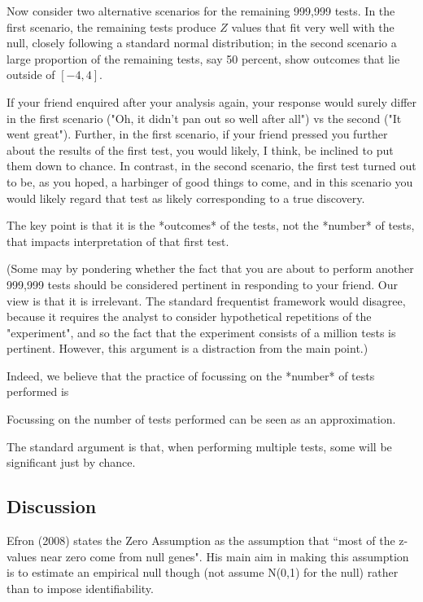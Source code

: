 \documentclass[10pt]{article}
\begin{document}
Now consider two alternative scenarios for the remaining 999,999 tests. In the first scenario, the remaining tests
produce $Z$ values that fit very well with the null, closely following a standard normal distribution; in the second
scenario a large proportion of the remaining tests, say 50 percent, show outcomes that lie outside of $[-4,4]$. 

If your friend enquired after your analysis again, your
response would surely differ in the first scenario ("Oh, it didn't pan out so well after all") vs the second ("It went great"). Further,
in the first scenario, if your friend pressed you further about the results of the first test,
you would likely, I think, be inclined to put them down to chance. In contrast, in the second scenario, the first test turned out to be, as you hoped, a harbinger of good things to come, and in this scenario you would likely regard that test as likely corresponding to a true discovery.

The key point is that it is the *outcomes* of the tests, not the *number* of tests, that impacts interpretation of that first test. 

(Some may by pondering whether the fact that you are about to perform another
999,999 tests should be considered pertinent in responding to your friend. Our view is that it is  irrelevant.
The standard frequentist framework would disagree, because
it requires the analyst to consider hypothetical repetitions
of the "experiment", and so the fact that the experiment
consists of a million tests is pertinent. However, this
argument is a distraction from the main point.)

Indeed, we believe that the practice of focussing on the *number* of tests performed is 

Focussing on the number of tests performed can be
seen as an approximation. 

The standard argument is that,
when performing multiple tests, some will be significant
just by chance.

\subsection{Discussion}

Efron (2008) states the Zero Assumption as the assumption that ``most of the z-values near zero come from null genes".
His main aim in making this assumption is to estimate an empirical null though (not assume N(0,1) for the null)
rather than to impose identifiability.
\end{document}
